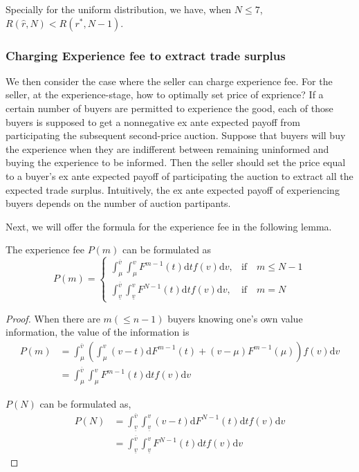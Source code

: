 \begin{remark}
 Specially for the uniform distribution, we have, when $N\leq 7$, $R(\hat{r}, N)<R(r^*, N-1)$. 
\end{remark}

\subsubsection{Charging Experience fee to extract trade surplus}
 We then consider the case where the seller can charge experience fee. For the seller, at the experience-stage, how to optimally set price of exprience? 
If a certain number of buyers are permitted to experience the good, each of those buyers is supposed to get a nonnegative ex ante expected payoff from participating the
subsequent second-price auction. Suppose that buyers will buy the experience when they are indifferent between remaining
uninformed and buying the experience to be informed. 
 Then the seller should set the price equal to a buyer's ex ante expected payoff of participating the auction to extract all the expected trade surplus. Intuitively, the ex ante expected payoff of experiencing buyers depends on the number of auction partipants. 



Next, we will offer the formula for the experience fee in the following lemma. 
\begin{lemma}
 The experience fee $P(m)$ can be formulated as 
\begin{equation}
 P(m) = \begin{cases}\int_{\mu}^{\overline{v}}\int_{\mu}^vF^{m-1}(t)\mathrm{d}tf(v) \mathrm{d} v, &\textrm{if}\quad m \leq N-1\\
\int_{\underline{v}}^{\overline{v}}\int_{\underline{v}}^v F^{N-1}(t)\mathrm{d}tf(v) \mathrm{d} v, &\textrm{if}\quad m = N
\end{cases}
\end{equation}


\end{lemma}
\begin{proof}
 When there are $m(\leq n-1)$ buyers knowing one's own value information, the value of the information is
\begin{align*}
P(m)&= \int_{\mu}^{\overline{v}}(\int_{\mu}^v (v-t)\mathrm{d}F^{m-1}(t)+(v-\mu)F^{m-1}(\mu))f(v)\mathrm{d}v \\
&= \int_{\mu}^{\overline{v}}\int_{\mu}^vF^{m-1}(t)\mathrm{d}tf(v)\mathrm{d}v
\end{align*}

$P(N)$ can be formulated as, 
 \begin{align*}
P(N) &= \int_{\underline{v}}^{\overline{v}}\int_{\underline{v}}^v(v-t)\mathrm{d}F^{N-1}(t)\mathrm{d}tf(v)\mathrm{d}v \\
 &= \int_{\underline{v}}^{\overline{v}}\int_{\underline{v}}^v F^{N-1}(t)\mathrm{d}tf(v)\mathrm{d}v
\end{align*}
\end{proof}


